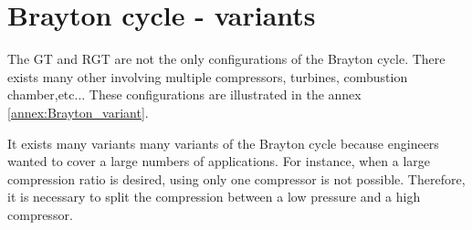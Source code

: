 \section{Brayton cycle - variants}
The GT and RGT are not the only configurations of the Brayton cycle. There exists many other involving multiple compressors, turbines, combustion chamber,etc... These configurations are illustrated in the annex \ref{annex:Brayton_variant}.

It exists many variants many variants of the Brayton cycle because engineers wanted to cover a large numbers of applications. For instance, when a large compression ratio is desired, using only one compressor is not possible. Therefore, it is necessary to split the compression between a low pressure and a high compressor. 
